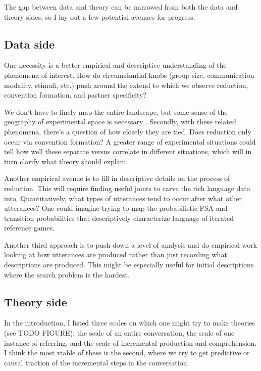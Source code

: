\documentclass[]{article}
\begin{document}
 The gap between data and theory can be narrowed from both the data and theory sides, so I lay out a few potential avenues for progress. 

\subsection{Data side}
	
	One necessity is a better empirical and descriptive understanding of the phenomena of interest. How do circumstantial knobs (group size, communication modality, stimuli, etc.) push around the extend to which we observe reduction, convention formation, and partner specificity? 
	
	We don't have to finely map the entire landscape, but some sense of the geography of experimental space is necessary \citep{almaatouq2022}. Secondly, with these related phenomena, there's a question of how closely they are tied. Does reduction only occur via convention formation? A greater range of experimental situations could tell how well these separate versus correlate in different situations, which will in turn clarify what theory should explain. 
	
	Another empirical avenue is to fill in descriptive details on the process of reduction. This will require finding useful joints to carve the rich language data into. Quantitatively, what types of utterances tend to occur after what other utterances? One could imagine trying to map the probabilistic FSA and transition probabilities that descriptively characterize language of iterated reference games.
	
	Another third approach is to push down a level of analysis and do empirical work looking at how utterances are produced rather than just recording what descriptions are produced. This might be especially useful for initial descriptions where the search problem is the hardest. %
	
	\subsection{Theory side}
	
	
	In the introduction, I listed three scales on which one might try to make theories (see TODO FIGURE): the scale of an entire conversation, the scale of one instance of referring, and the scale of incremental production and comprehension. 
	I think the most viable of these is the second, where we try to get predictive or causal traction of the incremental steps in the conversation. 
	
\end{document}
